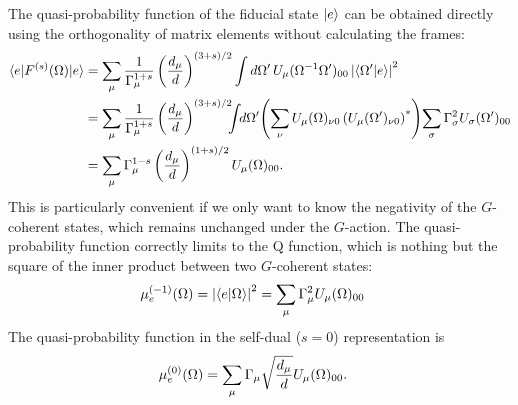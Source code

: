 The quasi-probability function of the fiducial state ${\left\vert{e}\right\rangle}$ can be obtained directly using the orthogonality of matrix elements without calculating the frames:
\begin{align}
	\braket{e|F^{(s)} (\Omega)|e}
	&= \sum_{\mu} \frac{1}{\Gamma_{\mu}^{1+s}} \left( \frac{d_{\mu}}{d} \right)^{(3+s)/2}
	\int d\Omega'\,\rep_{\mu}(\Omega^{-1}\Omega')_{00} \left| \braket{\Omega'|e} \right|^2 \nonumber \\
	&= \sum_{\mu} \frac{1}{\Gamma_{\mu}^{1+s}} \left( \frac{d_{\mu}}{d} \right)^{(3+s)/2}
	\!\!\! \int \!\! d\Omega' \!\left( \sum_{\nu} \rep_{\mu}(\Omega)_{\nu 0}  \left( \rep_{\mu}(\Omega')_{\nu 0} \right)^* \right)
	\!\sum_{\sigma} \Gamma_{\sigma}^2 \rep_{\sigma} (\Omega')_{00} \nonumber \\
	&= \sum_{\mu} \Gamma_{\mu}^{1-s} \left( \frac{d_{\mu}}{d} \right)^{(1+s)/2}
	 \rep_{\mu}(\Omega)_{00}.\label{brif-mann-coherent}
\end{align}
This is particularly convenient if we only want to know the negativity of the $G$-coherent states, which remains unchanged under the $G$-action.  The quasi-probability function correctly limits to the Q function, which is nothing but the square of the inner product between two $G$-coherent states:
\begin{align}
	\mu_e^{(-1)} (\Omega) = \left| \braket{e| \Omega} \right|^2 &=
	\sum_{\mu} \Gamma^2_{\mu} U_{\mu}(\Omega)_{00}
\end{align}
The quasi-probability function in the self-dual ($s=0$) representation is
\begin{align}\label{brif-mann-wigner}
\mu_e^{(0)} (\Omega) &= \sum_{\mu} \Gamma_{\mu} \sqrt{ \frac{d_{\mu}}{d}} \rep_{\mu}(\Omega)_{00}.
\end{align}

%



